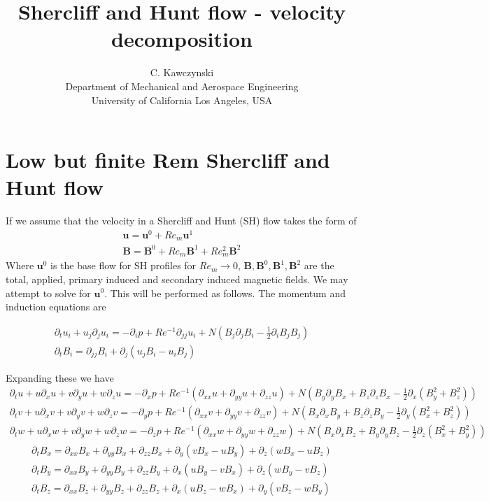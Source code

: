 \documentclass[11pt]{article}
\newcommand{\B}{\mathbf{B}}
\newcommand{\U}{\mathbf{u}}
\newcommand{\PD}{\partial}
\begin{document}
\doublespacing
\title{Shercliff and Hunt flow - velocity decomposition}
\author{C. Kawczynski \\
Department of Mechanical and Aerospace Engineering \\
University of California Los Angeles, USA\\
}
\maketitle

\section{Low but finite Rem Shercliff and Hunt flow}
If we assume that the velocity in a Shercliff and Hunt (SH) flow takes the form of
\begin{equation}\begin{aligned}
  \U = \U^0 + Re_m \U^1 \\
  \B = \B^0 + Re_m \B^1 + Re_m^2 \B^2
\end{aligned} \end{equation}
Where $\U^0$ is the base flow for SH profiles for $Re_m \rightarrow 0$, $\B,\B^0,\B^1,\B^2$ are the total, applied, primary induced and secondary induced magnetic fields. We may attempt to solve for $\U^0$. This will be performed as follows. The momentum and induction equations are

\begin{equation}\begin{aligned}
\PD_t u_i+u_j\PD_j u_i =-\PD_i p+ Re^{-1} \PD_{jj} u_i+ N (B_j \PD_j B_i - \tfrac{1}{2} \PD_i B_j B_j) \\
\PD_t B_i = \PD_{jj} B_i + \PD_j (u_j B_i - u_i B_j)
\end{aligned} \end{equation}

Expanding these we have
\begin{equation}\begin{aligned}
\PD_t u+u\PD_x u+v\PD_y u+w\PD_z u=-\PD_x p+Re^{-1}(\PD_{xx} u+\PD_{yy} u+\PD_{zz} u)+ N( B_y\PD_y B_x + B_z\PD_z B_x - \tfrac{1}{2} \PD_x (B_y^2+B_z^2)) \\
\PD_t v+u\PD_x v+v\PD_y v+w\PD_z v=-\PD_y p+Re^{-1}(\PD_{xx} v+\PD_{yy} v+\PD_{zz} v)+ N( B_x\PD_x B_y + B_z\PD_z B_y - \tfrac{1}{2} \PD_y (B_x^2+B_z^2)) \\
\PD_t w+u\PD_x w+v\PD_y w+w\PD_z w=-\PD_z p+Re^{-1}(\PD_{xx} w+\PD_{yy} w+\PD_{zz} w)+ N( B_x\PD_x B_z + B_y\PD_y B_z - \tfrac{1}{2} \PD_z (B_x^2+B_y^2))
\end{aligned} \end{equation}
\begin{equation}\begin{aligned}
\PD_t B_x=\PD_{xx}B_x+\PD_{yy}B_x+\PD_{zz}B_x + \PD_y (v B_x - u B_y) + \PD_z (w B_x - u B_z) \\
\PD_t B_y=\PD_{xx}B_y+\PD_{yy}B_y+\PD_{zz}B_y + \PD_x (u B_y - v B_x) + \PD_z (w B_y - v B_z) \\
\PD_t B_z=\PD_{xx}B_z+\PD_{yy}B_z+\PD_{zz}B_z + \PD_x (u B_z - w B_x) + \PD_y (v B_z - w B_y)
\end{aligned} \end{equation}
\end{document}

